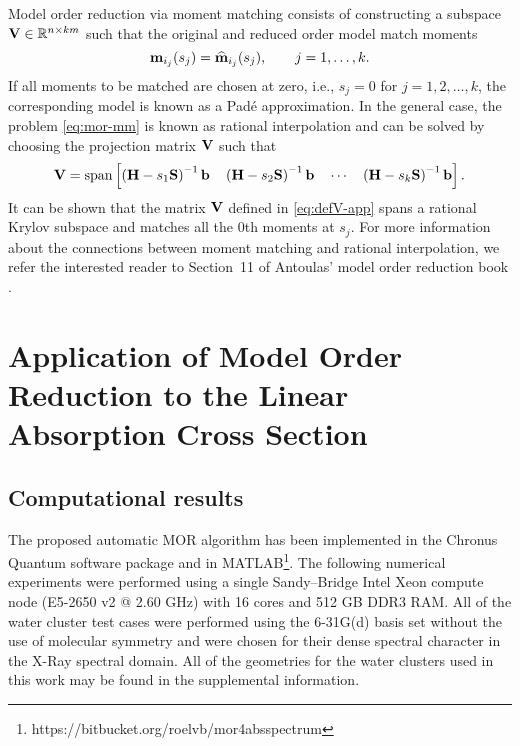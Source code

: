 Model order reduction via moment matching consists of constructing a subspace $\bV \inR[n][km]$ such that the original and reduced order model match moments
\begin{equation}
  \mathbf{m}_{i_j}(s_j) = \widehat{\mathbf{m}}_{i_j}(s_j), \qquad j = 1,\ldots,k.
  \label{eq:mor-mm}
\end{equation}
If all moments to be matched are chosen at zero, i.e., $s_j = 0$ for $j = 1,2,\ldots,k$, the corresponding model is known as a Pad\'{e} approximation. In the general case, the problem \eqref{eq:mor-mm} is known as rational interpolation and can be solved by choosing the projection matrix $\mathbf{V}$ such that
\begin{equation}
  \mathbf{V} = \mathrm{span}\left[  \left( \mathbf{H} - s_1\mathbf{S} \right)^{-1} \mathbf{b} \quad
                   \left( \mathbf{H} - s_2\mathbf{S} \right)^{-1} \mathbf{b} \quad
                    \cdots \quad
                   \left( \mathbf{H} - s_k\mathbf{S} \right)^{-1} \mathbf{b}  \right].
  \label{eq:defV-app}
\end{equation}
It can be shown that the matrix $\mathbf{V}$ defined in \eqref{eq:defV-app} spans a rational Krylov subspace and matches all the $0$th moments at $s_j$. For more information about the connections between moment matching and rational interpolation, we refer the interested reader to Section~11 of Antoulas' model order reduction book \cite{Antoulas2005}.

\section{Application of Model Order Reduction to the Linear Absorption 
  Cross Section}

\subsection{Computational results}
\label{sec:MORresults}

The proposed automatic MOR algorithm has been implemented in the Chronus
Quantum software package\cite{chronusq_beta} and in
MATLAB\footnote[4]{https://bitbucket.org/roelvb/mor4absspectrum}.
The following numerical experiments were performed using a single
Sandy--Bridge Intel Xeon compute node (E5-2650 v2 @ 2.60 GHz) with 16
cores and 512 GB DDR3 RAM. All of the water cluster test cases were performed
using the 6-31G(d) basis set without the use of molecular symmetry and
were chosen for their dense spectral character in the X-Ray spectral domain.
All of the geometries for the water clusters used in this work may be
found in the supplemental information.

